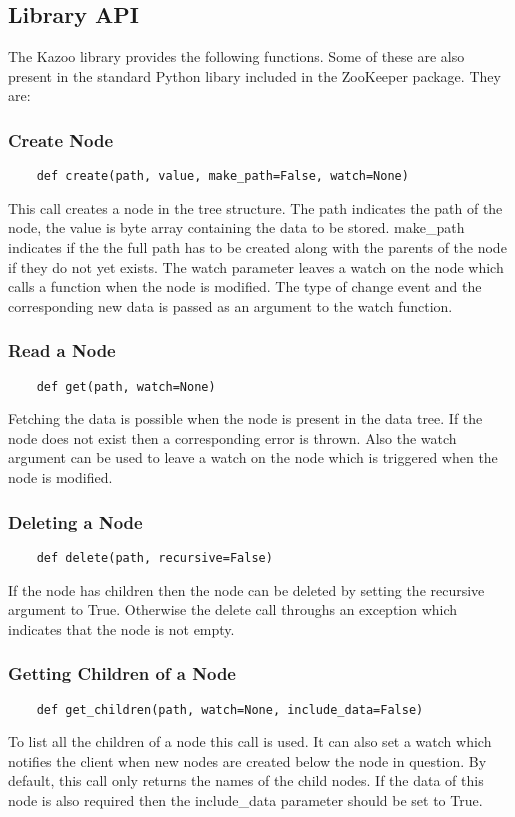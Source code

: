 \subsection{Library API}
The Kazoo library provides the following functions. Some of these are also present in the standard Python libary included in the ZooKeeper package. They are:
  \subsubsection{Create Node}
  \begin{lstlisting}
    def create(path, value, make_path=False, watch=None)
  \end{lstlisting}
  This call creates a node in the tree structure. The path indicates the path of the node, the value is byte array containing the data to be stored. make\_path indicates if the the full path has to be created along with the parents of the node if they do not yet exists. The watch parameter leaves a watch on the node which calls a function when the node is modified. The type of change event and the corresponding new data is passed as an argument to the watch function.
  \subsubsection{Read a Node}
  \begin{lstlisting}
    def get(path, watch=None)
  \end{lstlisting}
  Fetching the data is possible when the node is present in the data tree. If the node does not exist then a corresponding error is thrown. Also the watch argument can be used to leave a watch on the node which is triggered when the node is modified.
  \subsubsection{Deleting a Node}
  \begin{lstlisting}
    def delete(path, recursive=False)
  \end{lstlisting}
  If the node has children then the node can be deleted by setting the recursive argument to True. Otherwise the delete call throughs an exception which indicates that the node is not empty.
  
  \subsubsection{Getting Children of a Node}
  \begin{lstlisting}
    def get_children(path, watch=None, include_data=False)
  \end{lstlisting}
  To list all the children of a node this call is used. It can also set a watch which notifies the client when new nodes are created below the node in question. By default, this call only returns the names of the child nodes. If the data of this node is also required then the include\_data parameter should be set to True.
  
